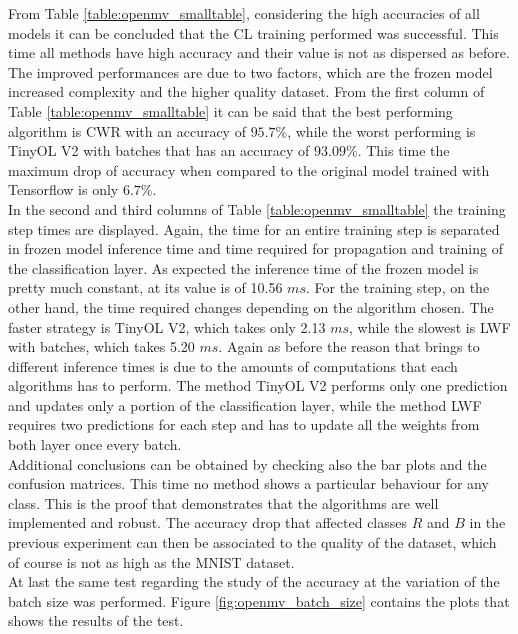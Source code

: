 \documentclass[12pt]{report}
\begin{document}
From Table \ref{table:openmv_smalltable}, considering the high accuracies of all models it can be concluded that the CL training performed was successful. This time all methods have high accuracy and their value is not as dispersed as before. The improved performances are due to two factors, which are the frozen model increased complexity and the higher quality dataset. From the first column of Table \ref{table:openmv_smalltable} it can be said that the best performing algorithm is CWR with an accuracy of   $95.7 \%$, while the worst performing is TinyOL V2 with batches that has an accuracy of $93.09 \%$. This time the maximum drop of accuracy when compared to the original model trained with Tensorflow is only $6.7 \%$.\\
In the second and third columns of Table \ref{table:openmv_smalltable} the training step times are displayed. Again, the time for an entire training step is separated in frozen model inference time and time required for propagation and training of the classification layer. As expected the inference time of the frozen model is pretty much constant, at its value is of 10.56 $ms$. For the training step, on the other hand, the time required changes depending on the algorithm chosen. The faster strategy is TinyOL V2, which takes only 2.13 $ms$, while the slowest is LWF with batches, which takes 5.20 $ms$. Again as before the reason that brings to different inference times is due to the amounts of computations that each algorithms has to perform.  The method TinyOL V2 performs only one prediction and updates only a portion of the classification layer, while the method LWF requires two predictions for each step and has to update all the weights from both layer once every batch.\\
Additional conclusions can be obtained by checking also the bar plots and the confusion matrices. This time no method shows a particular behaviour for any class. This is the proof that demonstrates that the algorithms are well implemented and robust. The accuracy drop that affected classes $R$ and $B$ in the previous experiment can then be associated to the quality of the dataset, which of course is not as high as the MNIST dataset.\\
At last the same test regarding the study of the accuracy at the variation of the batch size was performed. Figure \ref{fig:openmv_batch_size} contains the plots that shows the results of the test.\\
\end{document}

